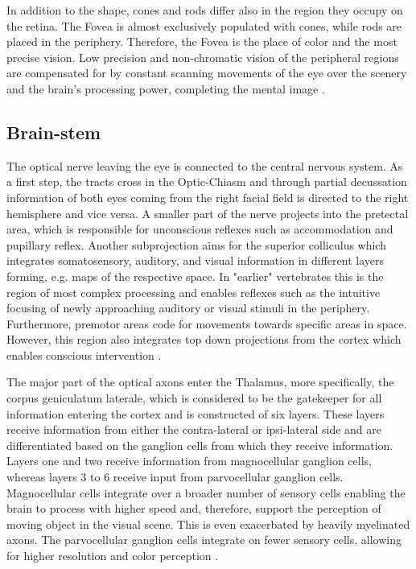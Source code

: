 In addition to the shape, cones and rods differ also in the region they occupy on the retina. The Fovea is almost exclusively populated with cones, while rods are placed in the periphery. Therefore, the Fovea is the place of color and the most precise vision. Low precision and non-chromatic vision of the peripheral regions are compensated for by constant scanning movements of the eye over the scenery and the brain's processing power, completing the mental image \parencite{kolb1995webvision}.


\subsection{Brain-stem}
The optical nerve leaving the eye is connected to the central nervous system. As a first step, the tracts cross in the Optic-Chiasm and through partial decussation information of both eyes coming from the right facial field is directed to the right hemisphere and vice versa. A smaller part of the nerve projects into the pretectal area, which is responsible for unconscious reflexes such as accommodation and pupillary reflex. Another subprojection aims for the superior colliculus which integrates somatosensory, auditory, and visual information in different layers forming, e.g. maps of the respective space. In "earlier" vertebrates this is the region of most complex processing and enables reflexes such as the intuitive focusing of newly approaching auditory or visual stimuli in the periphery. Furthermore, premotor areas code for movements towards specific areas in space. However, this region also integrates top down projections from the cortex which enables conscious intervention \parencite{fernandez2010anatomy, hubel1979BrainMech}.

The major part of the optical axons enter the Thalamus, more specifically, the corpus geniculatum laterale, which is considered to be the gatekeeper for all information entering the cortex and is constructed of six layers. These layers receive information from either the contra-lateral or ipsi-lateral side and are differentiated based on the ganglion cells from which they receive information. Layers one and two receive information from magnocellular ganglion cells, whereas layers 3 to 6 receive input from parvocellular ganglion cells. Magnocellular cells integrate over a broader number of sensory cells enabling the brain to process with higher speed and, therefore, support the perception of moving object in the visual scene. This is even exacerbated by heavily myelinated axons. The parvocellular ganglion cells integrate on fewer sensory cells, allowing for higher resolution and color perception \parencite{fernandez2010anatomy, hubel1979BrainMech}.

